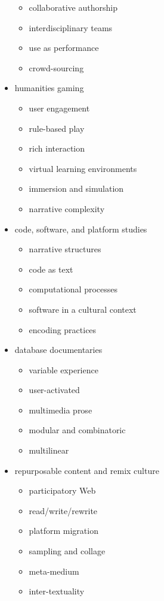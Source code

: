 \begin{multicols}{2}
\begin{itemize}
\begin{itemize}
    \item	collaborative authorship
    \item	interdisciplinary teams
    \item	use as performance
    \item	crowd-sourcing
  \end{itemize}
  \item humanities gaming
  \begin{itemize}
    \item user engagement
    \item	rule-based play
    \item	rich interaction
    \item	virtual learning environments
    \item	immersion and simulation
    \item	narrative complexity
  \end{itemize}
  \item code, software, and platform studies
  \begin{itemize}
    \item narrative structures
    \item	code as text
    \item	computational processes
    \item	software in a cultural context
    \item	encoding practices
  \end{itemize}
  \item database documentaries
  \begin{itemize}
    \item variable experience
    \item	user-activated
    \item	multimedia prose
    \item	modular and combinatoric
    \item	multilinear
  \end{itemize}
  \item repurposable content and remix culture
  \begin{itemize}
    \item participatory Web
    \item	read/write/rewrite
    \item	platform migration
    \item	sampling and collage
    \item	meta-medium
    \item	inter-textuality
  \end{itemize}

\end{itemize}
\end{multicols}
